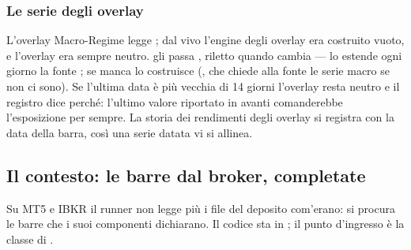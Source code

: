 \subsubsection{Le serie degli overlay}

L'overlay Macro-Regime legge ; dal vivo l'engine
degli overlay era costruito vuoto, e l'overlay era sempre neutro.
 gli passa
, riletto quando cambia --- lo estende
ogni giorno la fonte ; se manca lo costruisce
(, che chiede alla fonte le serie macro se
non ci sono). Se l'ultima data è più vecchia di
\num{14} giorni l'overlay resta neutro e il registro dice perché: l'ultimo
valore riportato in avanti comanderebbe l'esposizione per sempre. La storia
dei rendimenti degli overlay si registra con la data della barra, così una
serie datata vi si allinea.

\subsection{Il contesto: le barre dal broker, completate}\label{sez:live-contesto}

Su MT5 e IBKR il runner non legge più i file del deposito com'erano: si
procura le barre che i suoi componenti dichiarano. Il codice sta in
; il punto d'ingresso è la classe 
di .

